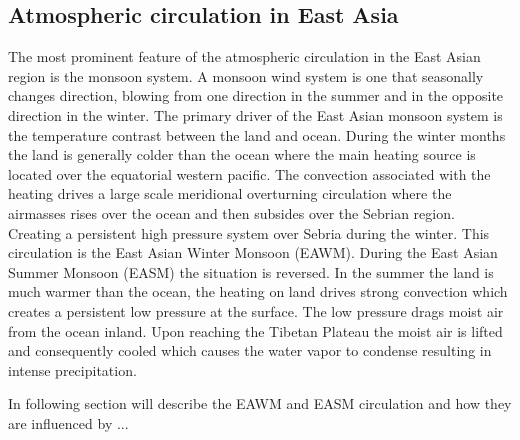 \subsection{Atmospheric circulation in East Asia}
The most prominent feature of the atmospheric circulation in the East Asian region is the monsoon system. A monsoon wind system is one that seasonally changes direction, blowing from one direction in the summer and in the opposite direction in the winter.  The primary driver of the East Asian monsoon system is the temperature contrast between the land and ocean. During the winter months the land is generally colder than the ocean where the main heating source is located over the equatorial western pacific. The convection associated with the heating drives a large scale meridional overturning circulation where the airmasses rises over the ocean and then subsides over the Sebrian region. Creating a persistent high pressure system over Sebria during the winter. This circulation is the East Asian Winter Monsoon (EAWM). During the East Asian Summer Monsoon (EASM) the situation is reversed. In the summer the land is much warmer than the ocean, the heating on land drives strong convection which creates a persistent low pressure at the surface. The low pressure drags moist air from the ocean inland. Upon reaching the Tibetan Plateau the moist air is lifted and consequently cooled which causes the water vapor to condense resulting in intense precipitation. 

In following section will describe the EAWM and EASM circulation and how they are influenced by ...   

